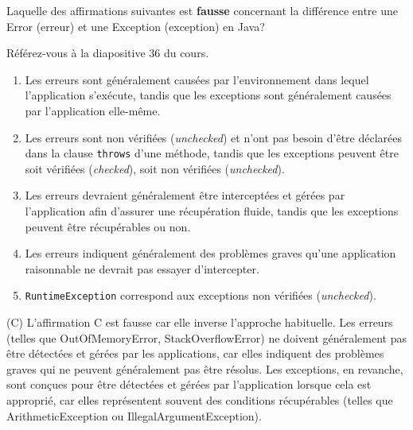  \begin{Exercice}[5 minutes]
Laquelle des affirmations suivantes est \textbf{fausse} concernant la différence entre une Error (erreur) et une Exception (exception) en Java?
\begin{conseil}
    Référez-vous à la diapositive 36 du cours.
\end{conseil}
\begin{enumerate}[label=(\Alph*)]
    \item Les erreurs sont généralement causées par l'environnement dans lequel l'application s'exécute, tandis que les exceptions sont généralement causées par l'application elle-même.
    \item Les erreurs sont non vérifiées (\textit{unchecked}) et n'ont pas besoin d'être déclarées dans la clause \texttt{throws} d'une méthode, tandis que les exceptions peuvent être soit vérifiées (\textit{checked}), soit non vérifiées (\textit{unchecked}).
    \item Les erreurs devraient généralement être interceptées et gérées par l'application afin d'assurer une récupération fluide, tandis que les exceptions peuvent être récupérables ou non.
    \item Les erreurs indiquent généralement des problèmes graves qu'une application raisonnable ne devrait pas essayer d'intercepter.
    \item \texttt{RuntimeException} correspond aux exceptions non vérifiées (\textit{unchecked}).
\end{enumerate}

\begin{solution}
(C) L'affirmation C est fausse car elle inverse l'approche habituelle. 
Les erreurs (telles que OutOfMemoryError, StackOverflowError) ne doivent généralement pas 
être détectées et gérées par les applications, car elles indiquent des problèmes graves qui ne peuvent 
généralement pas être résolus. Les exceptions, en revanche, sont conçues pour être détectées et gérées par l'application lorsque cela est approprié, 
car elles représentent souvent des conditions récupérables (telles que ArithmeticException ou IllegalArgumentException).
\end{solution}
 \end{Exercice}


